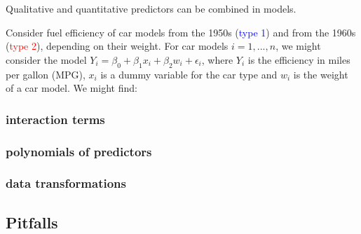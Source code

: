 Qualitative and quantitative predictors can be combined in models.

\begin{example}
	Consider fuel efficiency of car models from the 1950s (\textcolor{blue}{type 1}) and from the 1960s (\textcolor{red}{type 2}), depending on their weight. For car models $i=1,...,n$, we might consider the model $Y_i = \beta_0 + \beta_1x_i + \beta_2w_i + \epsilon_i$, where $Y_i$ is the efficiency in miles per gallon (MPG), $x_i$ is a dummy variable for the car type and $w_i$ is the weight of a car model. We might find:
	
\end{example}

\subsubsection{interaction terms}

\subsubsection{polynomials of predictors}

\subsubsection{data transformations}

\subsection{Pitfalls}